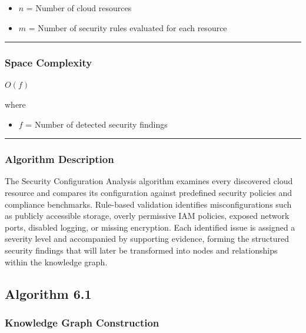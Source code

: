 \begin{itemize}
\tightlist
\item
$n$ = Number of cloud resources\\
\item
$m$ = Number of security rules evaluated for each resource
\end{itemize}

\begin{center}\rule{0.5\linewidth}{0.5pt}\end{center}

\subsubsection{Space Complexity}

$O(f)$

where

\begin{itemize}
\tightlist
\item
$f$ = Number of detected security findings
\end{itemize}

\begin{center}\rule{0.5\linewidth}{0.5pt}\end{center}

\subsubsection{Algorithm Description}

The Security Configuration Analysis algorithm examines every discovered cloud resource and compares its configuration against predefined security policies and compliance benchmarks. Rule-based validation identifies misconfigurations such as publicly accessible storage, overly permissive IAM policies, exposed network ports, disabled logging, or missing encryption. Each identified issue is assigned a severity level and accompanied by supporting evidence, forming the structured security findings that will later be transformed into nodes and relationships within the knowledge graph.

\subsection{Algorithm 6.1}

\subsubsection{Knowledge Graph Construction}

